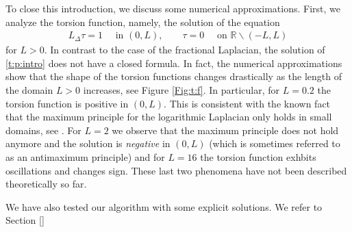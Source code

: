\documentclass[11 pt]{article}
\numberwithin{equation}{section}
\def\R{\mathbb{R}}
\begin{document}
To close this introduction, we discuss some numerical approximations.  First, we analyze the torsion function, namely, the solution of the equation
\begin{align}\label{t:p:intro}
 L_\Delta \tau = 1\quad \text{ in }(0,L),\qquad \tau=0\quad \text{ on }\R\backslash (-L,L)
\end{align}
for $L>0$.  In contrast to the case of the fractional Laplacian, the solution of \eqref{t:p:intro} does not have a closed formula. In fact, the numerical approximations show that the shape of the torsion functions changes drastically as the length of the domain $L>0$ increases, see Figure \ref{Fig:t:f}. In particular, for $L=0.2$ the torsion function is positive in $(0,L)$.  This is consistent with the known fact that the maximum principle for the logarithmic Laplacian only holds in small domains, see \cite[Corollary 1.9]{CW19}. For $L=2$ we observe that the maximum principle does not hold anymore and the solution is \emph{negative} in $(0,L)$ (which is sometimes referred to as an antimaximum principle) and for $L=16$ the torsion function exhbits oscillations and changes sign. These last two phenomena have not been described theoretically so far.

We have also tested our algorithm with some explicit solutions. We refer to Section \ref{}
\end{document}
